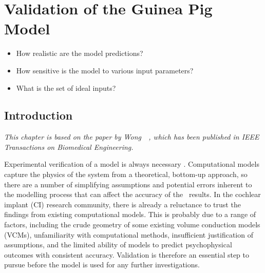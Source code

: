 	\pagestyle{fancy}
	\chead{}
	\rhead{{\sffamily \MakeUppercase\rightmark}}
	\lfoot{}
	\cfoot{{\sffamily \thepage}}
	\rfoot{}

\chapter{Validation of the Guinea Pig Model}
\label{sect:validation}

\begin{center}
	\begin{tcolorbox}[title=\boxtitle]
		\begin{itemize}[leftmargin=*,labelindent=2ex,labelsep=1.5ex,itemsep=0pt,parsep=0pt]
			\item How realistic are the model predictions?
			\item How sensitive is the model to various input parameters?
			\item What is the set of ideal inputs?
		\end{itemize}
	\end{tcolorbox}
\end{center}


\section{Introduction}
\label{sect:validation_intro}

\textit{This chapter is based on the paper by Wong~\etal~\cite{wong2016}, which
has been published in IEEE Transactions on Biomedical Engineering.}

Experimental verification of a model is always necessary \cite{miller1990,
schimpf1998}. Computational models capture the physics of the system from a
theoretical, bottom-up approach, so there are a number of simplifying
assumptions and potential errors inherent to the modelling process that can
affect the accuracy of the \insilico~results. In the cochlear implant (CI)
research community, there is already a reluctance to trust the findings from
existing computational models. This is probably due to a range of factors,
including the crude geometry of some existing volume conduction models (VCMs),
unfamiliarity with computational methods, insufficient justification of
assumptions, and the limited ability of models to predict psychophysical
outcomes with consistent accuracy. Validation is therefore an essential step to
pursue before the model is used for any further investigations.

